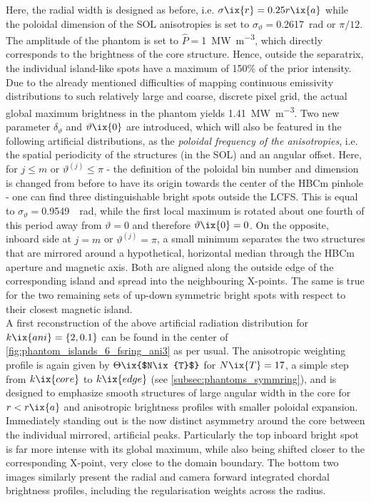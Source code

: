 %
            Here, the radial width is designed as before, i.e. $\sigma\ix{r}=0.25r\ix{a}$ while the poloidal dimension of the SOL anisotropies is set to $\sigma_{\vartheta}=$\SI{0.2617}{\radian} or $\pi/12$. The amplitude of the phantom is set to $\hat{P}=$\SI{1}{\mega\watt\per\cubic\meter}, which directly corresponds to the brightness of the core structure. Hence, outside the separatrix, the individual island-like spots have a maximum of 150\% of the prior intensity. Due to the already mentioned difficulties of mapping continuous emissivity distributions to such relatively large and coarse, discrete pixel grid, the actual global maximum brightness in the phantom yields \SI{1.41}{\mega\watt\per\cubic\meter}. Two new parameter $\delta_{\vartheta}$ and $\vartheta\ix{0}$ are introduced, which will also be featured in the following artificial distributions, as the \textit{poloidal frequency of the anisotropies}, i.e. the spatial periodicity of the structures (in the SOL) and an angular offset. Here, for $j\leq m$ or $\vartheta^{\left(j\right)}\leq\pi$ - the definition of the poloidal bin number and dimension is changed from before to have its origin towards the center of the HBCm pinhole - one can find three distinguishable bright spots outside the LCFS. This is equal to $\sigma_{\vartheta}=$\SI[per-mode=reciprocal]{0.9549}{\per\radian}, while the first local maximum is rotated about one fourth of this period away from $\vartheta=0$ and therefore $\vartheta\ix{0}=0$. On the opposite, inboard side at $j=m$ or $\vartheta^{\left(j\right)}=\pi$, a small minimum separates the two structures that are mirrored around a hypothetical, horizontal median through the HBCm aperture and magnetic axis. Both are aligned along the outside edge of the corresponding island and spread into the neighbouring X-points. The same is true for the two remaining sets of up-down symmetric bright spots with respect to their closest magnetic island.\\%
            A first reconstruction of the above artificial radiation distribution for $k\ix{ani}=\left\{2,0.1\right\}$ can be found in the center of \cref{fig:phantom_islands_6_fsring_ani3} as per usual. The anisotropic weighting profile is again given by $\Theta\ix{$N\ix{T}$}$ for $N\ix{T}=17$, a simple step from $k\ix{core}$ to $k\ix{edge}$ (see \cref{subsec:phantoms_symmring}), and is designed to emphasize smooth structures of large angular width in the core for $r<r\ix{a}$ and anisotropic brightness profiles with smaller poloidal expansion. Immediately standing out is the now distinct asymmetry around the core between the individual mirrored, artificial peaks. Particularly the top inboard bright spot is far more intense with its global maximum, while also being shifted closer to the corresponding X-point, very close to the domain boundary. The bottom two images similarly present the radial and camera forward integrated chordal brightness profiles, including the regularisation weights across the radius.\\%
